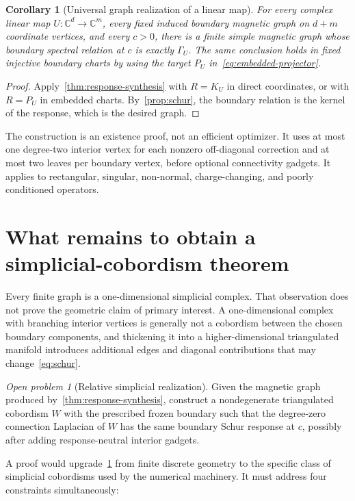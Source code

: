 \documentclass[11pt]{article}
\numberwithin{equation}{section}
\newtheorem{corollary}[theorem]{Corollary}
\theoremstyle{definition}
\theoremstyle{remark}
\newtheorem{openproblem}[theorem]{Open problem}
\newcommand{\C}{\mathbb{C}}
\begin{document}
\begin{corollary}[Universal graph realization of a linear map]
\label{cor:universal-map}
For every complex linear map $U:\C^d\to\C^m$, every fixed induced boundary
magnetic graph on $d+m$ coordinate vertices, and every $c>0$, there is a finite
simple magnetic graph whose boundary spectral relation at $c$ is exactly
$\Gamma_U$.  The same conclusion holds in fixed injective boundary charts by
using the target $P_U$ in~\cref{eq:embedded-projector}.
\end{corollary}

\begin{proof}
Apply~\cref{thm:response-synthesis} with $R=K_U$ in direct coordinates, or with
$R=P_U$ in embedded charts.  By~\cref{prop:schur}, the boundary relation is the
kernel of the response, which is the desired graph.
\end{proof}

The construction is an existence proof, not an efficient optimizer.  It uses
at most one degree-two interior vertex for each nonzero off-diagonal correction
and at most two leaves per boundary vertex, before optional connectivity
gadgets.  It applies to rectangular, singular, non-normal, charge-changing, and
poorly conditioned operators.

\section{What remains to obtain a simplicial-cobordism theorem}

Every finite graph is a one-dimensional simplicial complex.  That observation
does not prove the geometric claim of primary interest.  A one-dimensional
complex with branching interior vertices is generally not a cobordism between
the chosen boundary components, and thickening it into a higher-dimensional
triangulated manifold introduces additional edges and diagonal contributions
that may change~\eqref{eq:schur}.

\begin{openproblem}[Relative simplicial realization]
\label{open:relative-simplicial}
Given the magnetic graph produced by~\cref{thm:response-synthesis}, construct a
nondegenerate triangulated cobordism $W$ with the prescribed frozen boundary
such that the degree-zero connection Laplacian of $W$ has the same boundary
Schur response at $c$, possibly after adding response-neutral interior gadgets.
\end{openproblem}

A proof would upgrade~\cref{cor:universal-map} from finite discrete geometry to
the specific class of simplicial cobordisms used by the numerical machinery.
It must address four constraints simultaneously:
\end{document}
